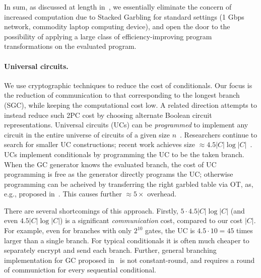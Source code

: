In sum, as discussed at length in~, we essentially eliminate the concern of increased computation due to Stacked Garbling for standard settings (1 Gbps network, commodity laptop computing device), and open the door to the possibility of applying a large class of efficiency-improving program transformations on the evaluated program.





 
 
 
\paragraph{Universal circuits.}
We use cryptographic techniques to reduce the cost of conditionals.  Our focus is the reduction of communication to that corresponding to the longest branch (SGC), while keeping the computational cost low.
A related direction attempts to instead reduce such 2PC cost by choosing alternate Boolean circuit representations.
Universal circuits (UCs) can be \emph{programmed} to implement any circuit in the entire universe of circuits of a given size $n$~\cite{STOC:Valiant76}.
Researchers continue to search for smaller UC constructions;
recent work achieves size $\approx 4.5 |C| \log |C|$~\cite{EPRINT:LipMohSad16,EC:KisSch16,AC:GunKisSch17,EPRINT:ZYZL19,EPRINT:AGKS19}.
%
UCs implement conditionals by programming the UC to be the taken branch. 
When the GC generator knows the evaluated branch, the cost of UC programming is free as the generator directly programs the UC; otherwise programming can be acheived by transferring the right garbled table via OT, as, e.g., proposed in~\cite{AC:KenKolWil17}.   This causes further $\approx 5\times$ overhead.

There are several shortcomings of this approach.  Firstly,  $5\cdot 4.5 |C| \log |C|$ (and even $4.5 |C| \log |C|$) is a significant {\em communication} cost, compared to our cost $|C|$.  For example, even for branches with only $2^{10}$ gates, the UC is $4.5 \cdot 10 = 45$ times larger than a single branch. 
For typical conditionals it is often much cheaper to separately encrypt and send each branch. 
Further, general branching implementation for GC proposed in~\cite{AC:KenKolWil17} is not constant-round, and requires a round of communiction for every sequential conditional.


